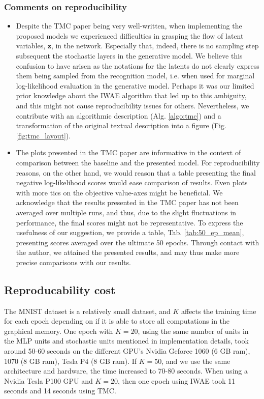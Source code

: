 \documentclass{article}
\begin{document}
\subsubsection*{Comments on reproducibility}
\label{sec:com_repro}
\begin{itemize}
    \item Despite the TMC paper being very well-written, when implementing the proposed models we experienced difficulties in grasping the flow of latent variables, $\bm z$, in the network. Especially that, indeed, there is no sampling step subsequent the stochastic layers in the generative model. We believe this confusion to have arisen as the notations for the latents do not clearly express them being sampled from the recognition model, i.e. when used for marginal log-likelihood evaluation in the generative model. Perhaps it was our limited prior knowledge about the IWAE algorithm that led up to this ambiguity, and this might not cause reproducibility issues for others. Nevertheless, we contribute with an algorithmic description (Alg. \ref{algo:tmc}) and a transformation of the original textual description into a figure (Fig. \ref{fig:tmc_layout}).
    \item The plots presented in the TMC paper are informative in the context of comparison between the baseline and the presented model. For reproducibility reasons, on the other hand, we would reason that a table presenting the final negative log-likelihood scores would ease comparison of results. Even plots with more tics on the objective value-axes might be beneficial. We acknowledge that the results presented in the TMC paper has not been averaged over multiple runs, and thus, due to the slight fluctuations in performance, the final scores might not be representative. To express the usefulness of our suggestion, we provide a table, Tab. \ref{tab:50_ep_mean}, presenting 
    scores averaged over the ultimate 50 epochs. Through contact with the author, we attained the presented results, and may thus make more precise comparisons with our results.
    
\end{itemize}

\subsection{Reproducability cost}
The MNIST dataset is a relatively small dataset, and $K$ affects the training time for each epoch depending on if it is able to store all computations in the graphical memory. One epoch with $K=20$, using the same number of units in the MLP units and stochastic units mentioned in implementation details, took around 50-60 seconds on the different GPU's Nvidia Geforce 1060 (6 GB ram), 1070 (8 GB ram), Tesla P4 (8 GB ram). If $K=50$, and we use the same architecture and hardware, the time increased to 70-80 seconds. When using a Nvidia Tesla P100 GPU and $K=20$, then one epoch using IWAE took 11 seconds and 14 seconds using TMC. 
\end{document}
